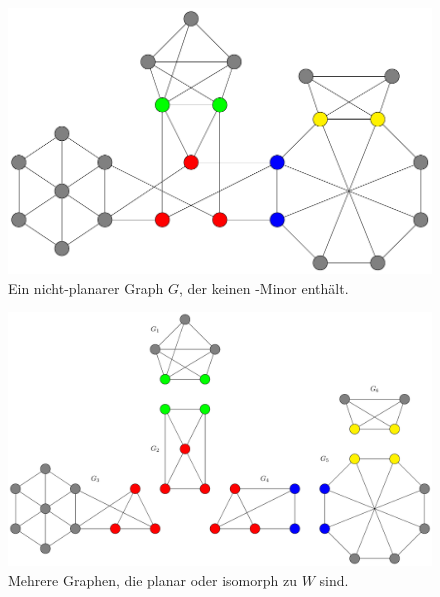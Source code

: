 \begin{figure}[H]
  \centering
  \includegraphics[width=\textwidth,height=\textheight,keepaspectratio]{bilder/WagnerTheorem1.pdf}
  \caption{Ein nicht-planarer Graph $G$, der keinen \kf-Minor enthält.}
  \label{fig:WagnerStruktur1}
\end{figure}

\begin{figure}[H]
  \centering
  \includegraphics[width=\textwidth,height=\textheight,keepaspectratio]{bilder/WagnerTheorem2.pdf}
  \caption{Mehrere Graphen, die planar oder isomorph zu $W$ sind.}
  \label{fig:WagnerStruktur2}
\end{figure}

